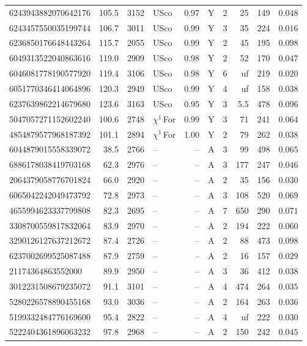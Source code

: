 \begin{longtable}{lrrlrlcrrr}
6243943882070642176 & 105.5 & 3152 & USco & 0.97 & Y & 2 & 25 & 149 & $0.048$ \\
6243457550035199744 & 106.7 & 3011 & USco & 0.99 & Y & 3 & 35 & 224 & $0.016$ \\
6236850176648443264 & 115.7 & 2055 & USco & 0.99 & Y & 2 & 45 & 195 & $0.098$ \\
6049313522040863616 & 119.0 & 2909 & USco & 0.98 & Y & 2 & 52 & 170 & $0.047$ \\
6046081778190577920 & 119.4 & 3106 & USco & 0.98 & Y & 6 & uf & 219 & $0.020$ \\
6051770346414064896 & 120.3 & 2949 & USco & 0.99 & Y & 4 & uf & 158 & $0.038$ \\
6237639862214679680 & 123.6 & 3163 & USco & 0.95 & Y & 3 & 5.5 & 478 & $0.096$ \\
5047057271152602240 & 100.6 & 2748 & $\chi^1$\,For & 0.99 & Y & 3 & 71 & 241 & $0.064$ \\
4854879577968187392 & 101.1 & 2894 & $\chi^1$\,For & 1.00 & Y & 2 & 79 & 262 & $0.038$ \\
6044879015558339072 & 38.5 & 2766 & -- & -- & A & 3 & 99 & 498 & $0.065$ \\
6886178038419703168 & 62.3 & 2976 & -- & -- & A & 3 & 177 & 247 & $0.046$ \\
2064379058776701824 & 66.0 & 2920 & -- & -- & A & 2 & 35 & 156 & $0.030$ \\
6065042242049473792 & 72.8 & 2973 & -- & -- & A & 3 & 108 & 520 & $0.069$ \\
4655994623337799808 & 82.3 & 2695 & -- & -- & A & 7 & 650 & 290 & $0.071$ \\
3308700559817832064 & 83.9 & 2970 & -- & -- & A & 2 & 194 & 222 & $0.060$ \\
3290126127637212672 & 87.4 & 2726 & -- & -- & A & 2 & 88 & 473 & $0.098$ \\
6237002699525087488 & 87.9 & 2759 & -- & -- & A & 2 & 16 & 157 & $0.029$ \\
21174364863552000 & 89.9 & 2950 & -- & -- & A & 3 & 36 & 412 & $0.038$ \\
3012231508679235072 & 91.1 & 3101 & -- & -- & A & 4 & 474 & 264 & $0.035$ \\
5280226578890455168 & 93.0 & 3036 & -- & -- & A & 2 & 164 & 263 & $0.036$ \\
5199332484776169600 & 95.4 & 2822 & -- & -- & A & 4 & uf & 222 & $0.030$ \\
5222404361896063232 & 97.8 & 2968 & -- & -- & A & 2 & 150 & 242 & $0.045$ \\

\end{longtable}
